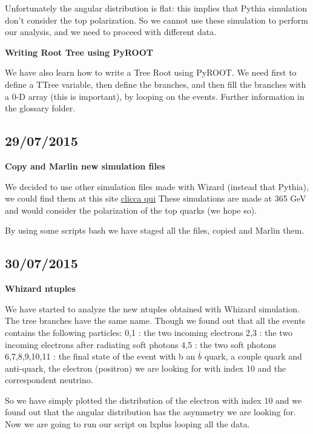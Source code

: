 Unfortunately the angular distribution is flat: this implies that Pythia simulation don't consider the top polarization. So we cannot use these simulation to perform our analysis, and we need to proceed with different data.

\textbf{Writing Root Tree using PyROOT}

We have also learn how to write a Tree Root using PyROOT. We need first to define a TTree variable, then define the branches, and then fill the branches with a 0-D array (this is important), by looping on the events.
Further information in the glossary folder.

\subsection{29/07/2015}

\textbf{Copy and Marlin new simulation files}

We decided to use other simulation files made with Wizard (instead that Pythia), we could find them at this site \href{https://twiki.cern.ch/twiki/bin/view/CLIC/MonteCarloSamplesForTopPhysics?sortcol=2;table=3;up=1#sorted_table.}{clicca qui}
These simulations are made at 365 GeV and would consider the polarization of the top quarks (we hope so).

By using some scripts bash we have staged all the files, copied and Marlin them.

\subsection{30/07/2015}

\textbf{Whizard ntuples}

We have started to analyze the new ntuples obtained with Whizard simulation. The tree branches have the same name. Though we found out that all the events contains the following particles:
0,1 : the two incoming electrons
2,3 : the two incoming electrons after radiating soft photons
4,5 : the two soft photons
6,7,8,9,10,11 : the final state of the event with b an $\bar{b}$ quark, a couple quark and anti-quark, the electron (positron) we are looking for with index 10 and the correspondent neutrino.

So we have simply plotted the distribution of the electron with index 10 and we found out that the angular distribution has the asymmetry we are looking for.\\
Now we are going to run our script on lxplus looping all the data.

